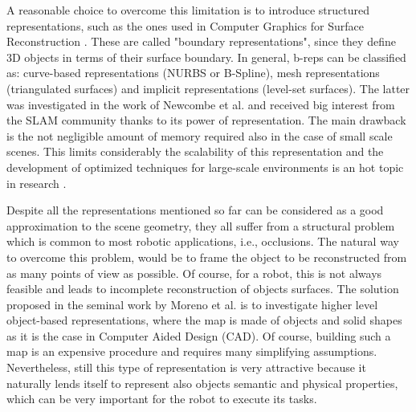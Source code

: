 \documentclass[]{article}
\begin{document}
A reasonable choice to overcome this limitation is to introduce structured representations, such as the ones used in Computer Graphics for Surface Reconstruction \cite{berger2014state}. These are called "boundary representations", since they define 3D objects in terms of their surface boundary. In general, b-reps can be classified as: curve-based representations (NURBS or B-Spline), mesh representations (triangulated surfaces) and implicit representations (level-set surfaces). The latter was investigated in the work of Newcombe et al. \cite{newcombe2011kinectfusion} and received big interest from the SLAM community thanks to its power of representation. The main drawback is the not negligible amount of memory required also in the case of small scale scenes. This limits considerably the scalability of this representation and the development of optimized techniques for large-scale environments is an hot topic in research \cite{kahler2015very,steinbrucker2014volumetric}.

Despite all the representations mentioned so far can be considered as a good approximation to the scene geometry, they all suffer from a structural problem which is common to most robotic applications, i.e., occlusions. The natural way to overcome this problem, would be to frame the object to be reconstructed from as many points of view as possible. Of course, for a robot, this is not always feasible and leads to incomplete reconstruction of objects surfaces. The solution proposed in the seminal work by Moreno et al. \cite{salas2013slam++} is to investigate higher level object-based representations, where the map is made of objects and solid shapes as it is the case in Computer Aided Design (CAD). Of course, building such a map is an expensive procedure and requires many simplifying assumptions. Nevertheless, still this type of representation is very attractive because it naturally lends itself to represent also objects semantic and physical properties, which can be very important for the robot to execute its tasks.



\end{document}

